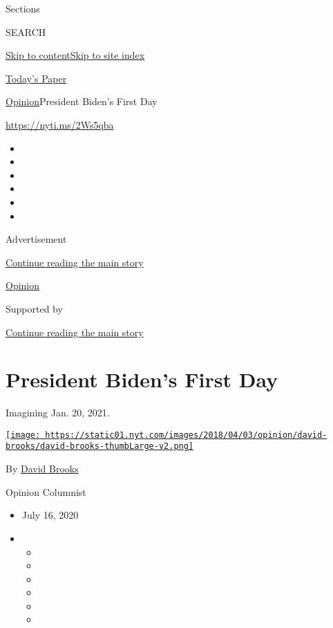 Sections

SEARCH

\protect\hyperlink{site-content}{Skip to
content}\protect\hyperlink{site-index}{Skip to site index}

\href{https://myaccount.nytimes.com/auth/login?response_type=cookie\&client_id=vi}{}

\href{https://www.nytimes.com/section/todayspaper}{Today's Paper}

\href{/section/opinion}{Opinion}\textbar{}President Biden's First Day

\href{https://nyti.ms/2Ws5qba}{https://nyti.ms/2Ws5qba}

\begin{itemize}
\item
\item
\item
\item
\item
\item
\end{itemize}

Advertisement

\protect\hyperlink{after-top}{Continue reading the main story}

\href{/section/opinion}{Opinion}

Supported by

\protect\hyperlink{after-sponsor}{Continue reading the main story}

\hypertarget{president-bidens-first-day}{%
\section{President Biden's First Day}\label{president-bidens-first-day}}

Imagining Jan. 20, 2021.

\href{https://www.nytimes.com/by/david-brooks}{\texttt{[image: https://static01.nyt.com/images/2018/04/03/opinion/david-brooks/david-brooks-thumbLarge-v2.png]}}

By \href{https://www.nytimes.com/by/david-brooks}{David Brooks}

Opinion Columnist

\begin{itemize}
\item
  July 16, 2020
\item
  \begin{itemize}
  \item
  \item
  \item
  \item
  \item
  \item
  \end{itemize}
\end{itemize}

